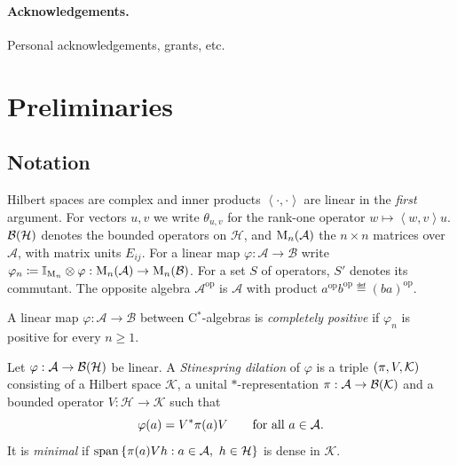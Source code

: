\documentclass[12pt]{article}
\newcommand{\alg}{\mathcal{A}}             %
\newcommand{\algB}{\mathcal{B}}            %
\newcommand{\hilb}{\mathcal{H}}            %
\newcommand{\dil}{\mathcal{K}}             %
\newcommand{\bdd}[1]{\mathcal{B}\br{#1}}   %
\newcommand{\matr}[2]{\mathrm{M}_{#1}\br{#2}} %
\newcommand{\op}{^{\mathrm{op}}}           %
\newcommand{\ip}[2]{\left\langle #1 , #2 \right\rangle}
\newcommand{\rankone}[2]{\theta_{#1, #2}}  %
\newcommand{\Stinespring}{\br{\pi, V, \dil}}
\begin{document}
\paragraph{Acknowledgements.}
Personal acknowledgements, grants, etc.

\section{Preliminaries}
\label{sec:preliminaries}

\subsection{Notation}
\label{sec:notation}

Hilbert spaces are complex and inner products \(\ip{\cdot}{\cdot}\) are linear in
the \emph{first} argument. For vectors \(u, v\) we write \(\rankone{u}{v}\) for the
rank-one operator \(w \mapsto \ip{w}{v} u\). \(\bdd{\hilb}\) denotes the bounded
operators on \(\hilb\), and \(\matr{n}{\alg}\) the \(n \times n\) matrices over
\(\alg\), with matrix units \(E_{ij}\). For a linear map
\(\varphi : \alg \to \algB\) write
\(\varphi_n \eqdef \id_{\mathrm{M}_n} \tensor \varphi :
\matr{n}{\alg} \to \matr{n}{\algB}\).
For a set \(S\) of operators, \(S'\) denotes its commutant.
The opposite algebra \(\alg\op\) is \(\alg\) with product
\(a\op b\op \eqdef (ba)\op\).

\begin{definition}
\label{def:cp}
A linear map \(\varphi : \alg \to \algB\) between C\(^*\)-algebras is
\emph{completely positive} if \(\varphi_n\) is positive for every \(n \ge 1\).
\end{definition}

\begin{definition}
\label{def:dilation}
Let \(\varphi : \alg \to \bdd{\hilb}\) be linear. A \emph{Stinespring dilation} of
\(\varphi\) is a triple \(\Stinespring\) consisting of a Hilbert space \(\dil\), a
unital \(*\)-representation \(\pi : \alg \to \bdd{\dil}\) and a bounded operator
\(V : \hilb \to \dil\) such that
\begin{equation}
\label{eq:dilation}
  \varphi(a) = V^\adjoint \pi(a) V \qquad \text{for all } a \in \alg .
\end{equation}
It is \emph{minimal} if \(\Span\set{\pi(a) V h : a \in \alg,\ h \in \hilb}\) is
dense in \(\dil\).
\end{definition}
\end{document}
